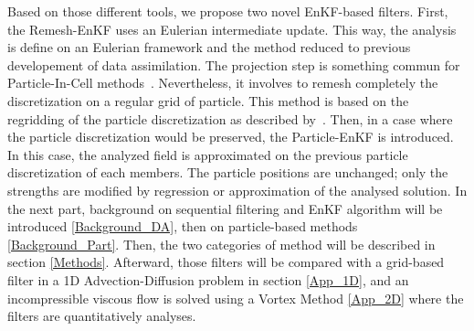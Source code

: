 Based on those different tools, we propose two novel EnKF-based filters. First, the Remesh-EnKF uses an Eulerian intermediate update. This way, the analysis is define on an Eulerian framework and the method reduced to previous developement of data assimilation. The projection step is something commun for Particle-In-Cell methods~\cite{sulsky_particle_1994,brackbill_flip_1988}. Nevertheless, it involves to remesh completely the discretization on a regular grid of particle. This method is based on the regridding of the particle discretization as described by~\cite{cottet_multi-purpose_1999}.
Then, in a case where the particle discretization would be preserved, the Particle-EnKF is introduced. In this case, the analyzed field is approximated on the previous particle discretization of each members. The particle positions are unchanged; only the strengths are modified by regression or approximation of the analysed solution.
In the next part, background on sequential filtering and EnKF algorithm will be introduced \ref{Background_DA}, then on particle-based methods \ref{Background_Part}. Then, the two categories of method will be described in section \ref{Methods}. Afterward, those filters will be compared with a grid-based filter in a 1D Advection-Diffusion problem in section \ref{App_1D}, and an incompressible viscous flow is solved using a Vortex Method \ref{App_2D} where the filters are quantitatively analyses.






